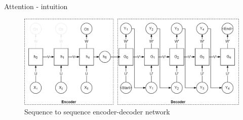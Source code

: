 \begin{frame}{Attention - intuition} 
\begin{center}
	\begin{figure}
		\includegraphics[width=1\textwidth]{figures/rnn_seq_2_seq_encoder_decoder}
		\caption*{{Sequence to sequence encoder-decoder network}}
	\end{figure}
\end{center}
\end{frame}